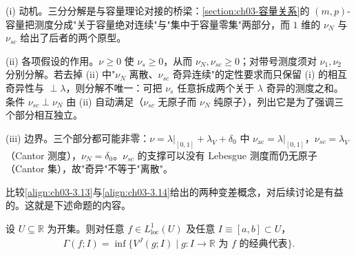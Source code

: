 \documentclass[../../main.tex]{subfiles}%
\begin{document}
\begin{remark}\label{remark:ch03-三分分解动机}
(i) 动机。三分分解是与容量理论对接的桥梁：\cref{section:ch03-容量关系}的 $(m,p)$-容量把测度分成"关于容量绝对连续"与"集中于容量零集"两部分，而 $1$ 维的 $\nu_N$ 与 $\nu_{sc}$ 给出了后者的两个原型。

(ii) 各项假设的作用。$\nu\geqslant0$ 使 $\nu_s\geqslant0$，从而 $\nu_N,\nu_{sc}\geqslant0$；对带号测度须对 $\nu_1,\nu_2$ 分别分解。若去掉 (ii) 中"$\nu_N$ 离散、$\nu_{sc}$ 奇异连续"的定性要求而只保留 (i) 的相互奇异性与 $\perp\lambda$，则分解不唯一：可把 $\nu_s$ 任意拆成两个关于 $\lambda$ 奇异的测度之和。条件 $\nu_{sc}\perp\nu_N$ 由 (ii) 自动满足（$\nu_{sc}$ 无原子而 $\nu_N$ 纯原子），列出它是为了强调三个部分相互独立。

(iii) 边界。三个部分都可能非零：$\nu=\lambda|_{[0,1]}+\lambda_V+\delta_0$ 中 $\nu_{\mathrm{ac}}=\lambda|_{[0,1]}$，$\nu_{sc}=\lambda_V$（Cantor 测度），$\nu_N=\delta_0$。$\nu_{sc}$ 的支撑可以没有 Lebesgue 测度而仍无原子（Cantor 集），故"奇异"不等于"离散"。
\end{remark}

比较\eqref{align:ch03-3.13}与\eqref{align:ch03-3.14}给出的两种变差概念，对后续讨论是有益的。这就是下述命题的内容。

\begin{proposition}\label{proposition:ch03-变差比较}
设 $U\subseteq\mathbb{R}$ 为开集。则对任意 $f\in L^1_{\mathrm{loc}}(U)$ 及任意 $I\equiv[a,b]\subset U$，
\begin{align}
\Gamma(f;I)=\inf\{V^J(g;I)\mid g:I\to\mathbb{R}\text{ 为 }f\text{ 的经典代表}\}.\label{align:ch03-3.18}
\end{align}
\end{proposition}
\end{document}
